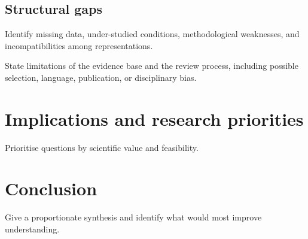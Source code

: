 \documentclass[11pt,a4paper]{article}
\begin{document}
\subsection{Structural gaps}
Identify missing data, under-studied conditions, methodological weaknesses, and
incompatibilities among representations.
\begin{GenesisLimitations}
State limitations of the evidence base and the review process, including possible selection,
language, publication, or disciplinary bias.
\end{GenesisLimitations}
\section{Implications and research priorities}
Prioritise questions by scientific value and feasibility.
\section{Conclusion}
Give a proportionate synthesis and identify what would most improve understanding.
\end{document}
